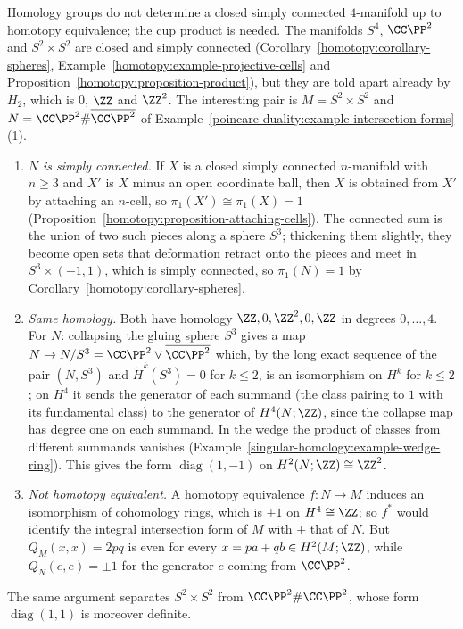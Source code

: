 \begin{counterexample}\label{poincare-duality:counterexample-four-manifolds}
Homology groups do not determine a closed simply connected $4$-manifold up to homotopy equivalence; the cup product is needed. The manifolds $S^4$, $\CC\PP^2$
and $S^2 \times S^2$ are closed and simply connected (Corollary~\ref{homotopy:corollary-spheres}, Example~\ref{homotopy:example-projective-cells} and
Proposition~\ref{homotopy:proposition-product}), but they are told apart already by $H_2$, which is $0$, $\ZZ$ and $\ZZ^2$. The interesting pair is
$M = S^2 \times S^2$ and $N = \CC\PP^2 \# \overline{\CC\PP^2}$ of Example~\ref{poincare-duality:example-intersection-forms}(1).
\begin{enumerate}
\item \emph{$N$ is simply connected.} If $X$ is a closed simply connected $n$-manifold with $n \geq 3$ and $X'$ is $X$ minus an open coordinate ball, then $X$ is obtained
from $X'$ by attaching an $n$-cell, so $\pi_1(X') \cong \pi_1(X) = 1$ (Proposition~\ref{homotopy:proposition-attaching-cells}). The connected sum is the union of two
such pieces along a sphere $S^3$; thickening them slightly, they become open sets that deformation retract onto the pieces and meet in $S^3 \times (-1, 1)$, which is
simply connected, so $\pi_1(N) = 1$ by Corollary~\ref{homotopy:corollary-spheres}.
\item \emph{Same homology.} Both have homology $\ZZ, 0, \ZZ^2, 0, \ZZ$ in degrees $0, \ldots, 4$. For $N$: collapsing the gluing sphere $S^3$ gives a map
$N \to N/S^3 = \CC\PP^2 \vee \overline{\CC\PP^2}$ which, by the long exact sequence of the pair $(N, S^3)$ and $\tilde{H}^k(S^3) = 0$ for $k \leq 2$, is an isomorphism
on $H^k$ for $k \leq 2$; on $H^4$ it sends the generator of each summand (the class pairing to $1$ with its fundamental class) to the generator of
$H^4(N; \ZZ)$, since the collapse map has degree one on each summand. In the wedge the product of classes from different summands vanishes
(Example~\ref{singular-homology:example-wedge-ring}). This gives the form $\operatorname{diag}(1, -1)$ on $H^2(N; \ZZ) \cong \ZZ^2$.
\item \emph{Not homotopy equivalent.} A homotopy equivalence $f \colon N \to M$ induces an isomorphism of cohomology rings, which is $\pm 1$ on
$H^4 \cong \ZZ$; so $f^*$ would identify the integral intersection form of $M$ with $\pm$ that of $N$. But $Q_M(x, x) = 2pq$ is even for every
$x = pa + qb \in H^2(M; \ZZ)$, while $Q_N(e, e) = \pm 1$ for the generator $e$ coming from $\CC\PP^2$.
\end{enumerate}
The same argument separates $S^2 \times S^2$ from $\CC\PP^2 \# \CC\PP^2$, whose form $\operatorname{diag}(1, 1)$ is moreover definite.
\end{counterexample}


